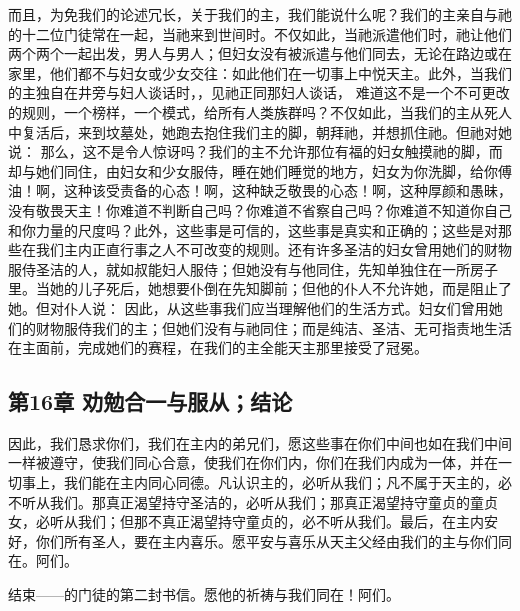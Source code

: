 而且，为免我们的论述冗长，关于我们的主，我们能说什么呢？我们的主亲自与祂的十二位门徒常在一起，当祂来到世间时。不仅如此，当祂派遣他们时，祂让他们两个两个一起出发，男人与男人；但妇女没有被派遣与他们同去，无论在路边或在家里，他们都不与妇女或少女交往：如此他们在一切事上中悦天主。此外，当我们的主独自在井旁与妇人谈话时，，见祂正同那妇人谈话，\newline{} 难道这不是一个不可更改的规则，一个榜样，一个模式，给所有人类族群吗？不仅如此，当我们的主从死人中复活后，来到坟墓处，她跑去抱住我们主的脚，朝拜祂，并想抓住祂。但祂对她说：\newline{} 那么，这不是令人惊讶吗？我们的主不允许那位有福的妇女触摸祂的脚，而却与她们同住，由妇女和少女服侍，睡在她们睡觉的地方，妇女为你洗脚，给你傅油！啊，这种该受责备的心态！啊，这种缺乏敬畏的心态！啊，这种厚颜和愚昧，没有敬畏天主！你难道不判断自己吗？你难道不省察自己吗？你难道不知道你自己和你力量的尺度吗？此外，这些事是可信的，这些事是真实和正确的；这些是对那些在我们主内正直行事之人不可改变的规则。还有许多圣洁的妇女曾用她们的财物服侍圣洁的人，就如叔能妇人服侍；但她没有与他同住，先知单独住在一所房子里。当她的儿子死后，她想要仆倒在先知脚前；但他的仆人不允许她，而是阻止了她。但对仆人说：\newline{} 因此，从这些事我们应当理解他们的生活方式。妇女们曾用她们的财物服侍我们的主；但她们没有与祂同住；而是纯洁、圣洁、无可指责地生活在主面前，完成她们的赛程，在我们的主全能天主那里接受了冠冕。\par


\subsection{第16章 劝勉合一与服从；结论}

因此，我们恳求你们，我们在主内的弟兄们，愿这些事在你们中间也如在我们中间一样被遵守，使我们同心合意，使我们在你们内，你们在我们内成为一体，并在一切事上，我们能在主内同心同德。凡认识主的，必听从我们；凡不属于天主的，必不听从我们。那真正渴望持守圣洁的，必听从我们；那真正渴望持守童贞的童贞女，必听从我们；但那不真正渴望持守童贞的，必不听从我们。最后，在主内安好，你们所有圣人，要在主内喜乐。愿平安与喜乐从天主父经由我们的主与你们同在。阿们。\par

结束——的门徒的第二封书信。愿他的祈祷与我们同在！阿们。\par

